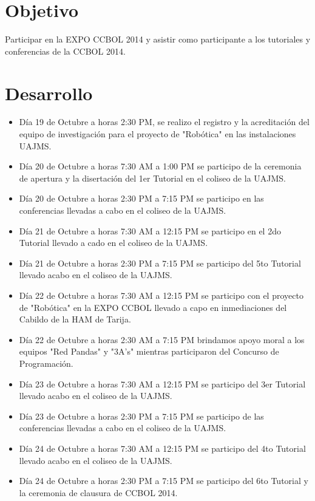 \documentclass[letterpaper,12pt]{article}
\begin{document}
	\section{Objetivo}
	
	Participar en la EXPO CCBOL 2014 y asistir como participante a los tutoriales y conferencias de la CCBOL 2014.
	
	\section{Desarrollo}
	
	\begin{itemize}
		\item D\'ia 19 de Octubre a horas 2:30 PM, se realizo el registro y la acreditaci\'on del equipo de investigaci\'on para el proyecto de "Rob\'otica" en las instalaciones UAJMS.
		
		\item D\'ia 20 de Octubre a horas 7:30 AM a 1:00 PM se participo de la ceremonia de apertura y la disertaci\'on del 1er Tutorial en el coliseo de la UAJMS.
		
		\item D\'ia 20 de Octubre a horas 2:30 PM a 7:15 PM se participo en las conferencias llevadas a cabo en el coliseo de la UAJMS.
		
		\item D\'ia	21 de Octubre a horas 7:30 AM a 12:15 PM se participo en el 2do Tutorial llevado a cado en el coliseo de la UAJMS.
		
		\item D\'ia 21 de Octubre a horas 2:30 PM a 7:15 PM se participo del 5to Tutorial llevado acabo en el coliseo de la UAJMS.
		
		\item D\'ia 22 de Octubre a horas 7:30 AM a 12:15 PM se participo con el proyecto de "Rob\'otica" en la EXPO CCBOL llevado a capo en inmediaciones  del Cabildo de la HAM de Tarija.
		
		\item D\'ia 22 de Octubre a horas 2:30 AM a 7:15 PM brindamos apoyo moral a los equipos "Red Pandas" y "3A's" mientras participaron del Concurso de Programaci\'on.  
		
		\item D\'ia 23 de Octubre a horas 7:30 AM a 12:15 PM se participo del 3er Tutorial llevado acabo en el coliseo de la UAJMS.
		
		\item D\'ia 23 de Octubre a horas 2:30 PM a 7:15 PM se participo de las conferencias llevadas a cabo en el coliseo de la UAJMS.
		
		\item D\'ia 24 de Octubre a horas 7:30 AM a 12:15 PM se participo del 4to Tutorial llevado acabo en el coliseo de la UAJMS.
		
		\item D\'ia 24 de Octubre a horas 2:30 PM a 7:15 PM se participo del 6to Tutorial y la ceremonia de clausura de CCBOL 2014.   

		\end{itemize}
		
\end{document}
